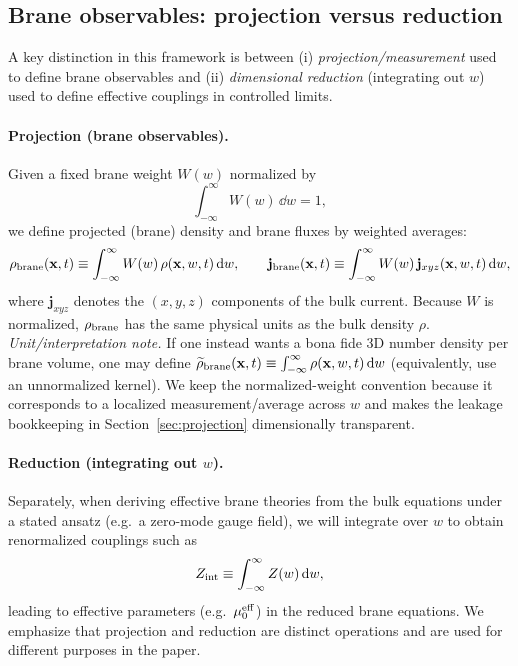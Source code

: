 \documentclass[11pt]{article}
\begin{document}
\subsection{Brane observables: projection versus reduction}
\label{sec:braneobs}

A key distinction in this framework is between (i) \emph{projection/measurement} used to define brane observables and (ii) \emph{dimensional reduction} (integrating out $w$) used to define effective couplings in controlled limits.

\paragraph{Projection (brane observables).}
Given a fixed brane weight $W(w)$ normalized by
\begin{equation}
\int_{-\infty}^{\infty} W(w)\,\dd w = 1,
\end{equation}
we define projected (brane) density and brane fluxes by weighted averages:
\begin{equation}
\rho_{\rm brane}(\mathbf{x},t)\equiv \int_{-\infty}^{\infty} W(w)\,\rho(\mathbf{x},w,t)\,\dd w,
\qquad
\mathbf{j}_{\rm brane}(\mathbf{x},t)\equiv \int_{-\infty}^{\infty} W(w)\,\mathbf{j}_{xyz}(\mathbf{x},w,t)\,\dd w,
\end{equation}
where $\mathbf{j}_{xyz}$ denotes the $(x,y,z)$ components of the bulk current. Because $W$ is normalized, $\rho_{\rm brane}$ has the same physical units as the bulk density $\rho$.
\noindent\emph{Unit/interpretation note.} If one instead wants a bona fide 3D number density per brane volume, one may define $\widetilde\rho_{\rm brane}(\mathbf x,t)\equiv\int_{-\infty}^{\infty}\rho(\mathbf x,w,t)\,\dd w$ (equivalently, use an unnormalized kernel). We keep the normalized-weight convention because it corresponds to a localized measurement/average across $w$ and makes the leakage bookkeeping in Section~\ref{sec:projection} dimensionally transparent.

\paragraph{Reduction (integrating out \texorpdfstring{$w$}{w}).}
Separately, when deriving effective brane theories from the bulk equations under a stated ansatz (e.g.\ a zero-mode gauge field), we will integrate over $w$ to obtain renormalized couplings such as
\begin{equation}
Z_{\rm int} \equiv \int_{-\infty}^{\infty} Z(w)\,\dd w,
\end{equation}
leading to effective parameters (e.g.\ $\mu_0^{\rm eff}$) in the reduced brane equations. We emphasize that projection and reduction are distinct operations and are used for different purposes in the paper.
\end{document}
